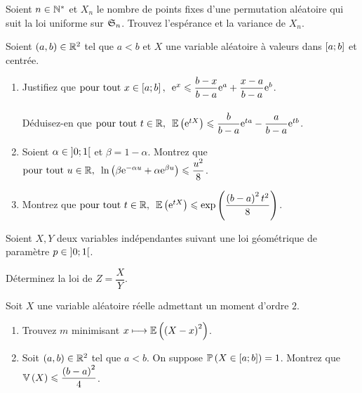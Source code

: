 \begin{exoss}
Soient \(n\in\Ns\) et \(X_n\) le nombre de points fixes d'une permutation aléatoire qui suit la loi uniforme sur \(\S{n}\). Trouvez l'espérance et la variance de \(X_n\).
\end{exoss}

\begin{exoss}
Soient \(\paren{a,b}\in\R^2\) tel que \(a<b\) et \(X\) une variable aléatoire à valeurs dans \(\intervii{a}{b}\) et centrée.

\begin{enumerate}
    \item Justifiez que \(\quantifs{\tpt x\in\intervii{a}{b}}\e{x}\leq\dfrac{b-x}{b-a}\e{a}+\dfrac{x-a}{b-a}\e{b}\). \\\\ Déduisez-en que \(\quantifs{\tpt t\in\R}\esp{\e{tX}}\leq\dfrac{b}{b-a}\e{ta}-\dfrac{a}{b-a}\e{tb}\). \\
    \item Soient \(\alpha\in\intervee{0}{1}\) et \(\beta=1-\alpha\). Montrez que \(\quantifs{\tpt u\in\R}\ln\paren{\beta\e{-\alpha u}+\alpha\e{\beta u}}\leq\dfrac{u^2}{8}\). \\
    \item Montrez que \(\quantifs{\tpt t\in\R}\esp{\e{tX}}\leq\exp\paren{\dfrac{\paren{b-a}^2t^2}{8}}\).
\end{enumerate}
\end{exoss}

\begin{exo}
Soient \(X,Y\) deux variables indépendantes suivant une loi géométrique de paramètre \(p\in\intervee{0}{1}\).

Déterminez la loi de \(Z=\dfrac{X}{Y}\).
\end{exo}

\begin{exo}
Soit \(X\) une variable aléatoire réelle admettant un moment d'ordre \(2\).

\begin{enumerate}
    \item Trouvez \(m\) minimisant \(x\mapsto\esp{\paren{X-x}^2}\). \\
    \item Soit \(\paren{a,b}\in\R^2\) tel que \(a<b\). On suppose \(\proba{X\in\intervii{a}{b}}=1\). Montrez que \(\vari{X}\leq\dfrac{\paren{b-a}^2}{4}\).
\end{enumerate}
\end{exo}

